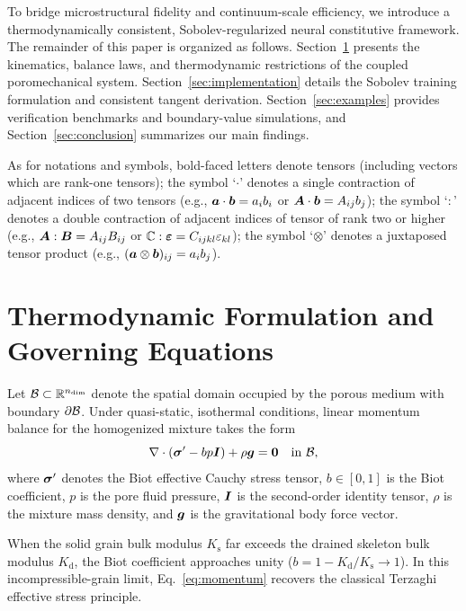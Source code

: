 \documentclass[11pt,a4paper]{article}
\begin{document}
To bridge microstructural fidelity and continuum-scale efficiency, we introduce a thermodynamically consistent, Sobolev-regularized neural constitutive framework. The remainder of this paper is organized as follows. Section~\ref{sec:formulation} presents the kinematics, balance laws, and thermodynamic restrictions of the coupled poromechanical system. Section~\ref{sec:implementation} details the Sobolev training formulation and consistent tangent derivation. Section~\ref{sec:examples} provides verification benchmarks and boundary-value simulations, and Section~\ref{sec:conclusion} summarizes our main findings.

As for notations and symbols, bold-faced letters denote tensors (including vectors which are rank-one tensors); the symbol `$\cdot$' denotes a single contraction of adjacent indices of two tensors (e.g., $\boldsymbol{a} \cdot \boldsymbol{b} = a_i b_i$ or $\boldsymbol{A} \cdot \boldsymbol{b} = A_{ij} b_j$); the symbol `$:$' denotes a double contraction of adjacent indices of tensor of rank two or higher (e.g., $\boldsymbol{A} : \boldsymbol{B} = A_{ij} B_{ij}$ or $\mathbb{C} : \boldsymbol{\varepsilon} = C_{ijkl} \varepsilon_{kl}$); the symbol `$\otimes$' denotes a juxtaposed tensor product (e.g., $(\boldsymbol{a} \otimes \boldsymbol{b})_{ij} = a_i b_j$).

\section{Thermodynamic Formulation and Governing Equations}
\label{sec:formulation}

Let $\mathcal{B} \subset \mathbb{R}^{n_{\mathrm{dim}}}$ denote the spatial domain occupied by the porous medium with boundary $\partial \mathcal{B}$. Under quasi-static, isothermal conditions, linear momentum balance for the homogenized mixture takes the form
\begin{equation}
  \nabla \cdot \left( \boldsymbol{\sigma}' - b p \boldsymbol{I} \right) + \rho \boldsymbol{g} = \boldsymbol{0} \quad \text{in } \mathcal{B},
  \label{eq:momentum}
\end{equation}
where $\boldsymbol{\sigma}'$ denotes the Biot effective Cauchy stress tensor, $b \in [0, 1]$ is the Biot coefficient, $p$ is the pore fluid pressure, $\boldsymbol{I}$ is the second-order identity tensor, $\rho$ is the mixture mass density, and $\boldsymbol{g}$ is the gravitational body force vector.

\begin{remark}
\label{rem:terzaghi}
When the solid grain bulk modulus $K_{\mathrm{s}}$ far exceeds the drained skeleton bulk modulus $K_{\mathrm{d}}$, the Biot coefficient approaches unity ($b = 1 - K_{\mathrm{d}}/K_{\mathrm{s}} \to 1$). In this incompressible-grain limit, Eq.~\eqref{eq:momentum} recovers the classical Terzaghi effective stress principle.
\end{remark}
\end{document}
